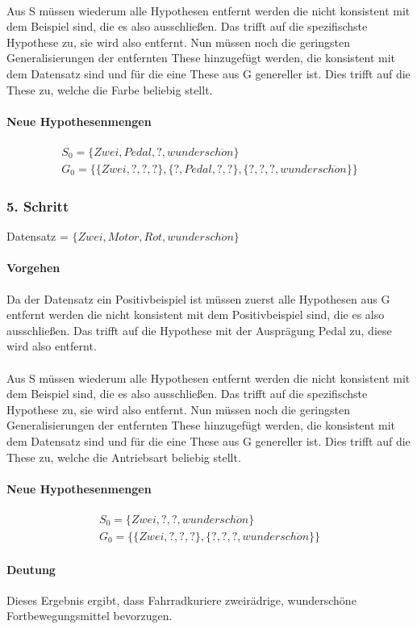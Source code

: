 \documentclass[a4paper]{article}
\begin{document}
\paragraph{}
Aus S müssen wiederum alle Hypothesen entfernt werden die nicht konsistent mit dem Beispiel sind, die es also ausschließen. Das trifft auf die spezifischste Hypothese zu, sie wird also entfernt. Nun müssen noch die geringsten Generalisierungen der entfernten These hinzugefügt werden, die konsistent mit dem Datensatz sind und für die eine These aus G genereller ist. Dies trifft auf die These zu, welche die Farbe beliebig stellt.
\paragraph{Neue Hypothesenmengen}
\begin{align*}
	S_0 = \{Zwei,Pedal,?,wundersch\ddot{o}n\} \\
	G_0 = \{ \{Zwei,?,?,?\},\{?,Pedal,?,?\}, \{?,?,?,wundersch\ddot{o}n\} \}
\end{align*}

\subsubsection{5. Schritt}
Datensatz = $ \{Zwei, Motor, Rot, wundersch\ddot{o}n\} $
\paragraph{Vorgehen}
Da der Datensatz ein Positivbeispiel ist müssen zuerst alle Hypothesen aus G entfernt werden die nicht konsistent mit dem Positivbeispiel sind, die es also ausschließen. Das trifft auf die Hypothese mit der Ausprägung Pedal zu, diese wird also entfernt. 
\paragraph{}
Aus S müssen wiederum alle Hypothesen entfernt werden die nicht konsistent mit dem Beispiel sind, die es also ausschließen. Das trifft auf die spezifischste Hypothese zu, sie wird also entfernt. Nun müssen noch die geringsten Generalisierungen der entfernten These hinzugefügt werden, die konsistent mit dem Datensatz sind und für die eine These aus G genereller ist. Dies trifft auf die These zu, welche die Antriebsart beliebig stellt.
\paragraph{Neue Hypothesenmengen}
\begin{align*}
	S_0 = \{Zwei,?,?,wundersch\ddot{o}n\} \\
	G_0 = \{ \{Zwei,?,?,?\}, \{?,?,?,wundersch\ddot{o}n\} \}
\end{align*}
\paragraph{Deutung}
Dieses Ergebnis ergibt, dass Fahrradkuriere zweirädrige, wunderschöne Fortbewegungsmittel bevorzugen.
\end{document}
